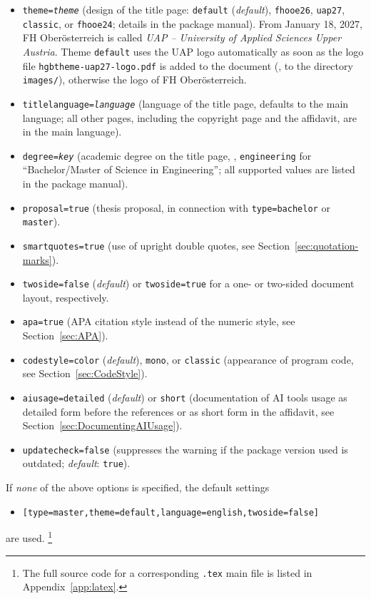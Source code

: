 \begin{itemize}
		\item[] \texttt{theme=\emph{theme}} (design of the title page: \texttt{default}
			(\emph{default}), \texttt{fhooe26}, \texttt{uap27}, \texttt{classic}, or
			\texttt{fhooe24}; details in the package manual). From January 18, 2027,
			FH Oberösterreich is called \emph{UAP -- University of Applied Sciences
			Upper Austria}. Theme \texttt{default} uses the UAP logo automatically as
			soon as the logo file \nolinkurl{hgbtheme-uap27-logo.pdf} is added to the
			document (\eg, to the directory \nolinkurl{images/}), otherwise the logo of
			FH Oberösterreich.
		\item[] \texttt{titlelanguage=\emph{language}} (language of the title page,
			defaults to the main language; all other pages, including the copyright
			page and the affidavit, are in the main language).
		\item[] \texttt{degree=\emph{key}} (academic degree on the title page, \eg,
			\texttt{engineering} for ``Bachelor/Master of Science in Engineering''; all
			supported values are listed in the package manual).
		\item[] \texttt{proposal=true} (thesis proposal, in connection with 
			\texttt{type=bachelor} or \texttt{master}).
    \item[] \texttt{smartquotes=true} (use of upright double quotes, see
			Section~\ref{sec:quotation-marks}).
		\item[] \texttt{twoside=false} (\emph{default}) or \texttt{twoside=true} for 
			a one- or two-sided document layout, respectively.
		\item[] \texttt{apa=true} (APA citation style instead of the numeric style,
			see Section~\ref{sec:APA}).
		\item[] \texttt{codestyle=color} (\emph{default}), \texttt{mono}, or \texttt{classic}
			(appearance of program code, see Section~\ref{sec:CodeStyle}).
		\item[] \texttt{aiusage=detailed} (\emph{default}) or \texttt{short}
			(documentation of AI tools usage as detailed form before the references or as
			short form in the affidavit, see Section~\ref{sec:DocumentingAIUsage}).
		\item[] \texttt{updatecheck=false} (suppresses the warning if the package
			version used is outdated; \emph{default}: \texttt{true}).
\end{itemize}
%
If \emph{none} of the above options is specified, the default settings 
\begin{itemize}
	\item[] \texttt{[type=master,theme=default,language=english,twoside=false]}
\end{itemize}
are used.%
\footnote{The full source code for a corresponding \texttt{.tex} main file is listed in
Appendix~\ref{app:latex}.}



